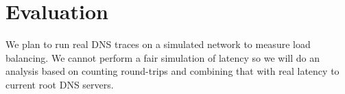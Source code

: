 \section{Evaluation}

We plan to run real DNS traces on a simulated network to
measure load balancing.  
We cannot perform a fair simulation of latency so we will do an
analysis based on counting round-trips and combining that
with real latency to current root DNS servers.


